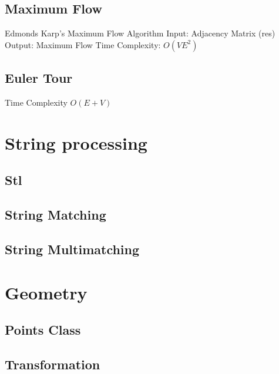 \documentclass[a4paper]{article}
\begin{document}
\begin{multicols}{3}
\subsection{Maximum Flow}
Edmonds Karp's Maximum Flow Algorithm \newline
Input:               Adjacency Matrix (res) \newline
Output:              Maximum Flow \newline
Time Complexity:     $O(VE^2)$



\subsection{Euler Tour}
Time Complexity $O(E + V)$


\section{String processing}

\subsection{Stl}


\subsection{String Matching}


\subsection{String Multimatching}


\section{Geometry}
\subsection{Points Class}


\subsection{Transformation}



\end{multicols}
\end{document}
